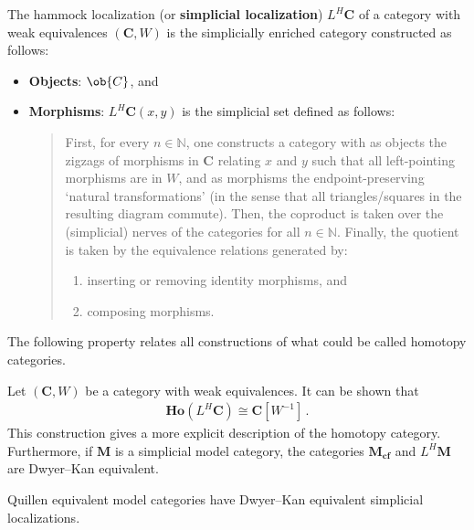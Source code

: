    \begin{construct}
        The hammock localization (or \textbf{simplicial localization}) $L^H\mathbf{C}$ of a category with weak equivalences $(\mathbf{C},W)$ is the simplicially enriched category constructed as follows:
        \begin{itemize}
            \item\textbf{Objects}: $\ob{C}$, and
            \item\textbf{Morphisms}: $L^H\mathbf{C}(x,y)$ is the simplicial set defined as follows:
            \begin{quote}
                First, for every $n\in\mathbb{N}$, one constructs a category with as objects the zigzags of morphisms in $\mathbf{C}$ relating $x$ and $y$ such that all left-pointing morphisms are in $W$, and as morphisms the endpoint-preserving `natural transformations' (in the sense that all triangles/squares in the resulting diagram commute). Then, the coproduct is taken over the (simplicial) nerves of the categories for all $n\in\mathbb{N}$. Finally, the quotient is taken by the equivalence relations generated by:
                \begin{enumerate}
                    \item inserting or removing identity morphisms, and
                    \item composing morphisms.
                \end{enumerate}
            \end{quote}
        \end{itemize}
    \end{construct}

    The following property relates all constructions of what could be called homotopy categories.
    \begin{property}
        Let $(\mathbf{C},W)$ be a category with weak equivalences. It can be shown that
        \begin{gather}
            \mathbf{Ho}(L^H\mathbf{C})\cong\mathbf{C}[W^{-1}]\,.
        \end{gather}
        This construction gives a more explicit description of the homotopy category. Furthermore, if $\mathbf{M}$ is a simplicial model category, the categories $\mathbf{M_{cf}}$ and $L^H\mathbf{M}$ are Dwyer--Kan equivalent.
    \end{property}
    \begin{property}
        Quillen equivalent model categories have Dwyer--Kan equivalent simplicial localizations.
    \end{property}

